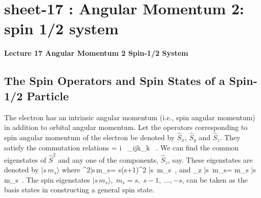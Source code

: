 \chapter{sheet-17 : Angular Momentum 2: spin 1/2 system}


\ifpdf
\graphicspath{{Chapter17/figs/}}
\else
\graphicspath{{Chapter17/figs/}}
\fi


\setcounter{chapter}{17}
\noindent
\begin{Large}
	{\bf Lecture 17 \newline
		Angular Momentum 2 \newline
		Spin-1/2 System
	}
\end{Large}


\vspace{5 mm}

\section{The Spin Operators and Spin States of a Spin-1/2 Particle}
The electron has an intrinsic angular momentum (i.e., spin angular momentum) in addition to orbital angular momentum. Let the operators corresponding to spin angular momentum of the electron be denoted by
$\hat{S}_x$, $\hat{S}_y$ and $\hat{S}_z$. They satisfy the commutation relations
 = i \hbar\, \epsilon_{ijk}_k \, .
\label{eq:commutation} 
\ee
We can find the common eigenstates of $\hat{S}^2$ and any one of the components, $\hat{S}_z$, say. These eigenstates are denoted by $|s\, m_s\rangle$ where
\be
{}^2|s\,m_s\rangle = s(s+1)\hbar^2 |s\, m_s\rangle\, ,
\ee
and
\be
{}_z |s\, m_s\rangle = m_s \hbar |s\, m_s\rangle\, . 
\ee
The spin eigenstates $|s\, m_s\rangle,\; m_s = s,\; s-1,\; \dots ,-s$, can be taken as the basis states in constructing a general spin state.

